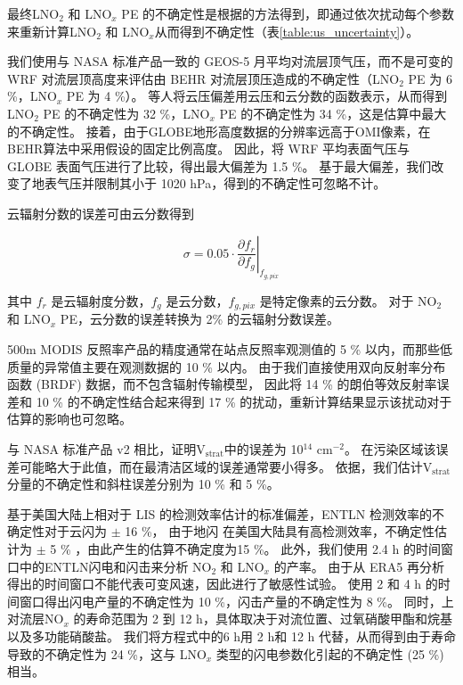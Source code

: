 最终LNO$_2$ 和 LNO$_x$ PE 的不确定性是根据\citet{Pickering.2016,Allen.2019,Bucsela.2019,Lapierre.2020}的方法得到，即通过依次扰动每个参数来重新计算LNO$_2$ 和 LNO$_x$从而得到不确定性（表\ref{table:us_uncertainty}）。

我们使用与 NASA 标准产品一致的 GEOS-5 月平均对流层顶气压，而不是可变的 WRF 对流层顶高度来评估由 BEHR 对流层顶压造成的不确定性（LNO$_2$ PE 为 6 \%，LNO$_x$ PE 为 4 \%）。
\citet{Acarreta.2004}等人将云压偏差用云压和云分数的函数表示，从而得到LNO$_2$ PE 的不确定性为 32 \%，LNO$_x$ PE 的不确定性为 34 \%，这是估算中最大的不确定性。
接着，由于GLOBE地形高度数据的分辨率远高于OMI像素，在BEHR算法中采用假设的固定比例高度。
因此，\citet{Laughner.2019a}将 WRF 平均表面气压与 GLOBE 表面气压进行了比较，得出最大偏差为 1.5 \%。
基于最大偏差，我们改变了地表气压并限制其小于 1020 hPa，得到的不确定性可忽略不计。

云辐射分数的误差可由云分数得到

\begin{equation}
\sigma = 0.05 \cdot \left.\frac{\partial{f_r}}{\partial{f_g}}\right|_{f_{g,pix}}
\end{equation}

其中 $f_r$ 是云辐射度分数，$f_g$ 是云分数，$f_{g,pix}$ 是特定像素的云分数。
对于 NO$_2$ 和 LNO$_x$ PE，云分数的误差转换为 2\% 的云辐射分数误差。

500m MODIS 反照率产品的精度通常在站点反照率观测值的 5 \% 以内，而那些低质量的异常值主要在观测数据的 10 \% 以内\citep{Schaaf.2011}。
由于我们直接使用双向反射率分布函数 (BRDF) 数据，而不包含辐射传输模型，
因此将 14 \% 的朗伯等效反射率误差和 10 \% 的不确定性结合起来得到 17 \% 的扰动\citep{Laughner.2019a}，重新计算结果显示该扰动对于估算的影响也可忽略。

与 NASA 标准产品 v2 相比，\citet{Krotkov.2017}证明V$_\textrm{strat}$中的误差为 10$^{14}$ cm$^{-2}$。
在污染区域该误差可能略大于此值，而在最清洁区域的误差通常要小得多\citep{Bucsela.2013}。
依据\citet{Allen.2019}，我们估计V$_\textrm{strat}$分量的不确定性和斜柱误差分别为 10 \% 和 5 \%。

基于美国大陆上相对于 LIS 的检测效率估计的标准偏差，ENTLN 检测效率的不确定性对于云闪为 $\pm$ 16 \%，
由于地闪 在美国大陆具有高检测效率，不确定性估计为 $\pm$ 5 \% \citep{Lapierre.2020}，由此产生的估算不确定度为15 \%。
此外，我们使用 2.4 h 的时间窗口中的ENTLN闪电和闪击来分析 NO$_2$ 和 LNO$_x$ 的产率。
由于从 ERA5 再分析得出的时间窗口不能代表可变风速，因此进行了敏感性试验。
使用 2 和 4 h 的时间窗口得出闪电产量的不确定性为 10 \%，闪击产量的不确定性为 8 \%。
同时，上对流层NO$_x$ 的寿命范围为 2 到 12 h，具体取决于对流位置、过氧硝酸甲酯和烷基以及多功能硝酸盐\citep{Nault.2017}。
我们将方程式中的6 h用 2 h和 12 h 代替，从而得到由于寿命导致的不确定性为 24 \%，这与 LNO$_x$ 类型的闪电参数化引起的不确定性 (25 \%) 相当。

